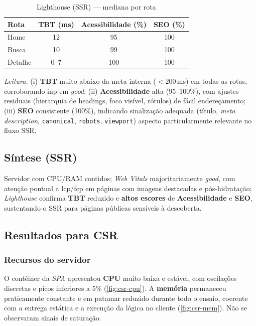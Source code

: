 \begin{table}[H]
\centering
\caption{Lighthouse (SSR) — mediana por rota}
\label{tab:lh-ssr}
\begin{tabular}{|l|c|c|c|}
\hline
\textbf{Rota} & \textbf{TBT (ms)} & \textbf{Acessibilidade (\%)} & \textbf{SEO (\%)} \\
\hline
Home    & 12 & 95  & 100 \\
Busca   & 10 & 99  & 100 \\
Detalhe & 0--7\footnotemark[1] & 100 & 100 \\
\hline
\end{tabular}
\end{table}

\noindent \textit{Leitura.}
(i) \textbf{TBT} muito abaixo da meta interna ($<200$\,ms) em todas as rotas, corroborando \acrshort{inp} em \textit{good};
(ii) \textbf{Acessibilidade} alta (95--100\%), com ajustes residuais (hierarquia de headings, foco visível, rótulos) de fácil endereçamento;
(iii) \textbf{SEO} consistente (100\%), indicando sinalização adequada (título, \emph{meta description}, \texttt{canonical}, \texttt{robots}, \texttt{viewport}) aspecto particularmente relevante no fluxo SSR.

\subsection{Síntese (SSR)}
Servidor com CPU/RAM contidos; \emph{Web Vitals} majoritariamente \textit{good}, com atenção pontual a \acrshort{lcp}/\acrshort{fcp} em páginas com imagens destacadas e pós-hidratação; \emph{Lighthouse} confirma \textbf{TBT} reduzido e \textbf{altos escores} de \textbf{Acessibilidade} e \textbf{SEO}, sustentando o SSR para páginas públicas sensíveis à descoberta.

\subsection{Resultados para CSR}
\label{subsec:resultados-csr}

\subsubsection{Recursos do servidor}
O contêiner da \emph{SPA} apresentou \textbf{CPU} muito baixa e estável, com oscilações discretas e picos inferiores a 5\% (\autoref{fig:csr-cpu}). A \textbf{memória} permaneceu praticamente constante e em patamar reduzido durante todo o ensaio, coerente com a entrega estática e a execução da lógica no cliente (\autoref{fig:csr-mem}). Não se observaram sinais de saturação.


